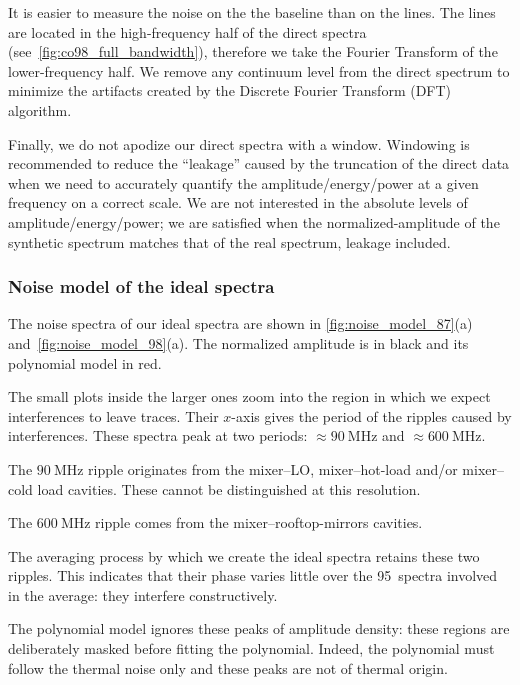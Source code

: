 It is easier to measure the noise on the the baseline than on the lines.
The lines are located in the high-frequency half of the direct spectra (see~\cref{fig:co98_full_bandwidth}), therefore we take the Fourier Transform of the lower-frequency half.
We remove any continuum level from the direct spectrum to minimize the artifacts created by the Discrete Fourier Transform (DFT) algorithm.

Finally, we do not apodize our direct spectra with a window.
Windowing is recommended to reduce the ``leakage'' caused by the truncation of the direct data when we need to accurately quantify the amplitude/energy/power at a given frequency on a correct scale.
We are not interested in the absolute levels of amplitude/energy/power;
we are satisfied when the normalized-amplitude of the synthetic spectrum matches that of the real spectrum, leakage included.

\subsubsection{Noise model of the ideal spectra}

The noise spectra of our ideal spectra are shown in \cref{fig:noise_model_87}(a)
and~\cref{fig:noise_model_98}(a).
The normalized amplitude is in black and its polynomial model in red.

The small plots inside the larger ones zoom into the region in which we expect interferences to leave traces.
Their $x$-axis gives the period of the ripples caused by interferences.
These spectra peak at two periods:
$\approx\SI{90}{\mega\hertz}$ and $\approx\SI{600}{\mega\hertz}$.

The $\SI{90}{\mega\hertz}$ ripple originates from the mixer--LO, mixer--hot-load and/or mixer--cold load cavities.
These cannot be distinguished at this resolution.

The $\SI{600}{\mega\hertz}$ ripple comes from the mixer--rooftop-mirrors cavities.

The averaging process by which we create the ideal spectra retains these two ripples.
This indicates that their phase varies little over the 95~spectra involved in the average:
they interfere constructively.

The polynomial model ignores these peaks of amplitude density: these regions are deliberately masked before fitting the polynomial.
Indeed, the polynomial must follow the thermal noise only and these peaks are not of thermal origin.

